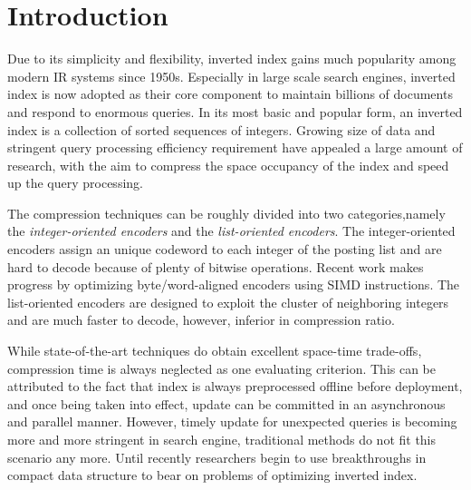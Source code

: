\documentclass[runningheads,a4paper]{llncs}
\begin{document}
\section{Introduction}
Due to its simplicity and flexibility, inverted index gains much popularity among modern IR systems since 1950s. Especially in large scale search engines, inverted index is now adopted as their core component to maintain billions of documents and respond to enormous queries. In its most basic and popular form, an inverted index is a collection of sorted sequences of integers\cite{manning2008introduction,witten1999managing,zobel2006inverted}. Growing size of data and stringent query processing efficiency requirement have appealed a large amount of research, with the aim to compress the space occupancy of the index and speed up the query processing.

The compression techniques can be roughly divided into two categories,namely the \textit{integer-oriented encoders} and the \textit{list-oriented encoders}\cite{catena2014inverted,silvestri2010vsencoding}. The integer-oriented encoders assign an unique codeword to each integer of the posting list and are hard to decode because of plenty of bitwise operations. Recent work makes progress by optimizing byte/word-aligned encoders using SIMD instructions\cite{stepanov2011simd,trotman2014compression}. The list-oriented encoders are designed to exploit the cluster of neighboring integers and are much faster to decode, however, inferior in compression ratio.

While state-of-the-art techniques do obtain excellent space-time trade-offs, compression time is always neglected as one evaluating criterion. This can be attributed to the fact that index is always preprocessed offline before deployment, and once being taken into effect, update can be committed in an asynchronous and parallel manner. However, timely update for unexpected queries is becoming more and more stringent in search engine, traditional methods do not fit this scenario any more. Until recently researchers begin to use breakthroughs in compact data structure to bear on problems of optimizing inverted index\cite{navarro2010dual,ottaviano2014partitioned,petri2014score}.
\end{document}
